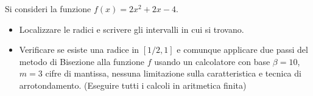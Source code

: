 Si consideri la funzione $f(x)=2x^2+2x-4$.
\begin{itemize}
\item  Localizzare le radici e
scrivere gli intervalli in cui si trovano.
\item Verificare se esiste una radice in $[1/2,1]$ e comunque applicare due passi del
metodo di Bisezione alla funzione $f$ usando un calcolatore con
base $\beta =10$, $m=3$ cifre di mantissa, nessuna limitazione
sulla caratteristica e tecnica di arrotondamento. (Eseguire tutti
i calcoli in aritmetica finita)
\end{itemize}

